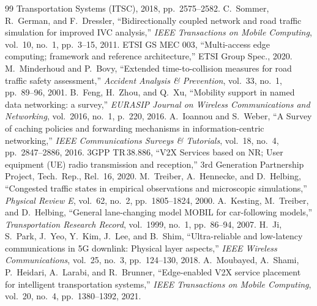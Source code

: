 \documentclass[journal]{IEEEtran}
\begin{document}
\begin{thebibliography}{99}
{Transportation Systems (ITSC)}, 2018, pp.~2575--2582.
C.~Sommer, R.~German, and F.~Dressler,
``Bidirectionally coupled network and road traffic simulation
for improved IVC analysis,'' \emph{IEEE Transactions on Mobile
Computing}, vol.~10, no.~1, pp.~3--15, 2011.
ETSI GS MEC 003, ``Multi-access edge computing; framework and reference
architecture,'' ETSI Group Spec., 2020.
M.~Minderhoud and P.~Bovy, ``Extended time-to-collision measures for road 
traffic safety assessment,'' \emph{Accident Analysis \& Prevention}, 
vol.~33, no.~1, pp.~89--96, 2001.
B.~Feng, H.~Zhou, and Q.~Xu,
``Mobility support in named data networking: a survey,''
\emph{EURASIP Journal on Wireless Communications and Networking},
vol.~2016, no.~1, p.~220, 2016.
A.~Ioannou and S.~Weber,
``A Survey of caching policies and forwarding mechanisms in information-centric networking,''
\emph{IEEE Communications Surveys \& Tutorials},
vol.~18, no.~4, pp.~2847--2886, 2016.
3GPP TR\,38.886, ``V2X Services based on NR; User equipment (UE)
radio transmission and reception,'' 3rd Generation Partnership
Project, Tech.\ Rep., Rel.\ 16, 2020.
M.~Treiber, A.~Hennecke, and D.~Helbing,
``Congested traffic states in empirical observations and microscopic simulations,''
\emph{Physical Review E},
vol.~62, no.~2, pp.~1805--1824, 2000.
A.~Kesting, M.~Treiber, and D.~Helbing,
``General lane-changing model MOBIL for car-following models,''
\emph{Transportation Research Record},
vol.~1999, no.~1, pp.~86--94, 2007.
H.~Ji, S.~Park, J.~Yeo, Y.~Kim, J.~Lee, and B.~Shim, 
``Ultra-reliable and low-latency communications in 5G downlink: 
Physical layer aspects,'' \emph{IEEE Wireless Communications}, 
vol.~25, no.~3, pp.~124--130, 2018.
A.~Moubayed, A.~Shami, P.~Heidari, A.~Larabi, and R.~Brunner,
``Edge-enabled V2X service placement for intelligent transportation systems,''
\emph{IEEE Transactions on Mobile Computing},
vol.~20, no.~4, pp.~1380--1392, 2021.
\end{thebibliography}
\end{document}
